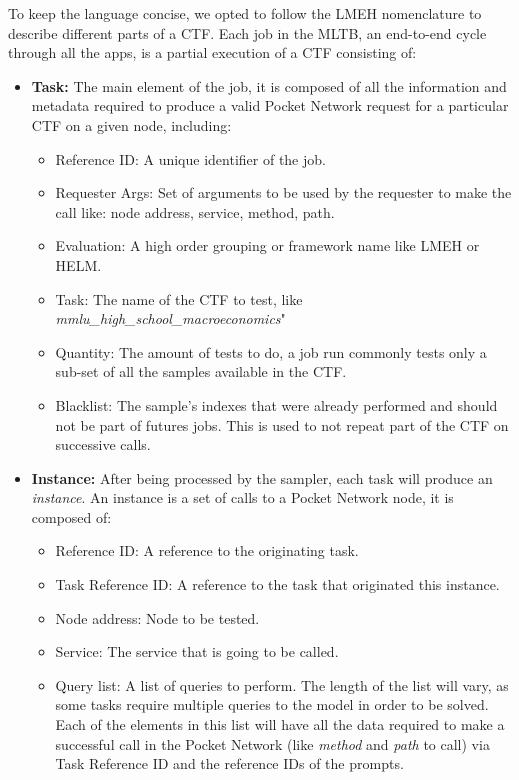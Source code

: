 To keep the language concise, we opted to follow the \gls{LMEH} nomenclature to describe different parts of a \gls{CTF}. Each job in the \gls{MLTB}, an end-to-end cycle through all the apps, is a partial execution of a \gls{CTF} consisting of:
\begin{itemize}
    \item \textbf{Task:} The main element of the job, it is composed of all the information and metadata required to produce a valid Pocket Network request for a particular \gls{CTF} on a given node, including:
    \begin{itemize}
        \item Reference ID: A unique identifier of the job.
        \item Requester Args: Set of arguments to be used by the requester to make the call like: node address, service, method, path.
        \item Evaluation: A high order grouping or framework name like \gls{LMEH} or \gls{HELM}.
        \item Task: The name of the \gls{CTF} to test, like \emph{mmlu\_high\_school\_macroeconomics}"
        \item Quantity: The amount of tests to do, a job run commonly tests only a sub-set of all the samples available in the \gls{CTF}.
        \item Blacklist: The sample's indexes that were already performed and should not be part of futures jobs. This is used to not repeat part of the \gls{CTF} on successive calls.
    \end{itemize}
    \item \textbf{Instance:} After being processed by the sampler, each task will produce an \emph{instance}. An instance is a set of calls to a Pocket Network node, it is composed of:
    \begin{itemize}
        \item Reference ID: A reference to the originating task.
        \item Task Reference ID: A reference to the task that originated this instance.
        \item Node address: Node to be tested.
        \item Service: The service that is going to be called.
        \item Query list: A list of queries to perform. The length of the list will vary, as some tasks require multiple queries to the model in order to be solved. Each of the elements in this list will have all the data required to make a successful call in the Pocket Network (like \emph{method} and \emph{path} to call) via Task Reference ID and the reference IDs of the prompts.

\end{itemize}
\end{itemize}

